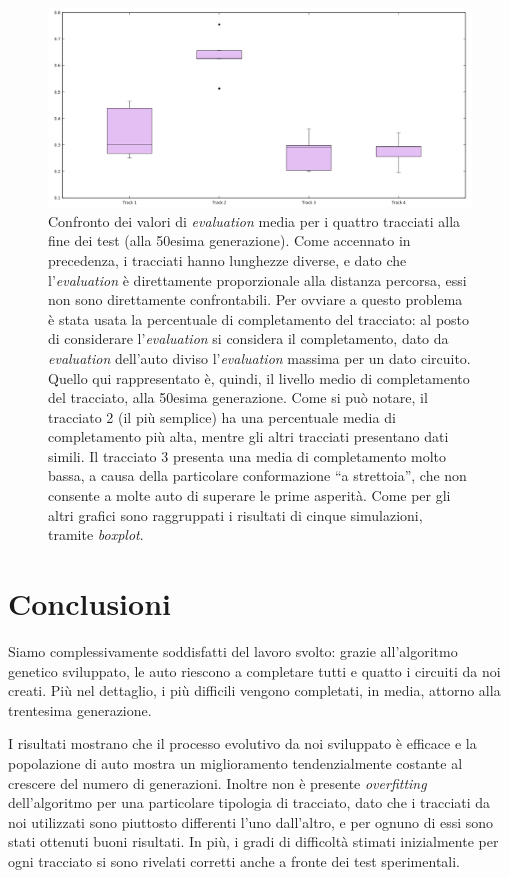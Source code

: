 \documentclass[a4paper,12pt]{article}
\begin{document}
\begin{figure}[H]
	\centering
	\includegraphics[width=130mm]{../results/avgEvAtTheEnd.png}
	\caption{Confronto dei valori di \emph{evaluation} media per i quattro tracciati alla fine dei test (alla 50esima generazione). Come accennato in precedenza, i tracciati hanno lunghezze diverse, e dato che l'\emph{evaluation} è direttamente proporzionale alla distanza percorsa, essi non sono direttamente confrontabili. Per ovviare a questo problema è stata usata la percentuale di completamento del tracciato: al posto di considerare l'\emph{evaluation} si considera il completamento, dato da \emph{evaluation} dell'auto diviso l'\emph{evaluation} massima per un dato circuito. Quello qui rappresentato è, quindi, il livello medio di completamento del tracciato, alla 50esima generazione. Come si può notare, il tracciato 2 (il più semplice) ha una percentuale media di completamento più alta, mentre gli altri tracciati presentano dati simili. Il tracciato 3 presenta una media di completamento molto bassa, a causa della particolare conformazione ``a strettoia'', che non consente a molte auto di superare le prime asperità. Come per gli altri grafici sono raggruppati i risultati di cinque simulazioni, tramite \emph{boxplot}.}
\end{figure}


\section{Conclusioni} \label{conclusions}

Siamo complessivamente soddisfatti del lavoro svolto: grazie all'algoritmo genetico sviluppato, le auto riescono a completare tutti e quatto i circuiti da noi creati. Più nel dettaglio, i più difficili vengono completati, in media, attorno alla trentesima generazione.

I risultati mostrano che il processo evolutivo da noi sviluppato è efficace e la popolazione di auto mostra un miglioramento tendenzialmente costante al crescere del numero di generazioni. Inoltre non è presente \emph{overfitting} dell'algoritmo per una particolare tipologia di tracciato, dato che i tracciati da noi utilizzati sono piuttosto differenti l'uno dall'altro, e per ognuno di essi sono stati ottenuti buoni risultati. In più, i gradi di difficoltà stimati inizialmente per ogni tracciato si sono rivelati corretti anche a fronte dei test sperimentali. 
\end{document}
